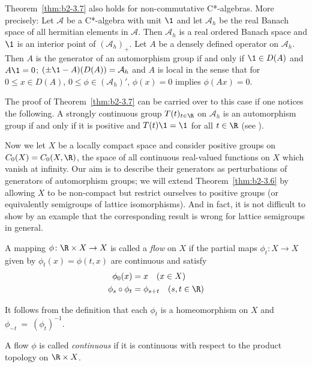 \begin{remark*}\label{rem:b2-3.7b}
Theorem~\ref{thm:b2-3.7} also holds for non-com\-mutative C*-algebras.
More precisely: Let $\mathcal{A}$ be a C*-algebra with unit $\1$ and let $\mathcal{A}_{h}$ be the real Banach space of all hermitian elements in $\mathcal{A}$.
Then $\mathcal{A}_{h}$ is a real ordered Banach space and $\1$ is an interior point of\/ $(\mathcal{A}_{h})_{+}$.
Let $A$ be a densely defined operator on $\mathcal{A}_{h}$.
Then $A$ is the generator of an automorphism group if and only if\/ $\1 \in D(A)$ and $A\1 = 0$; $(\pm\1 - A)(D(A)) = \mathcal{A}_{h}$ and $A$ is local in the sense that for $0 \leq x \in D(A)$, $0 \leq \phi \in (\mathcal{A}_{h})'$, $\phi(x) = 0$ implies $\phi(Ax) = 0$.

The proof of Theorem~\ref{thm:b2-3.7} can be carried over to this case if one notices the following.
A strongly continuous group $T(t)_{t \in \R}$ on $\mathcal{A}_{h}$ is an automorphism group if and only if it is positive and $T(t)\1 = \1$ for all $t \in \R$ (see \textcite[Corollary 3.2.21]{brattelirobinson:1979}).
\end{remark*}

Now we let $X$ be a locally compact space and consider positive groups on $C_{0}(X) = C_{0}(X,\R)$, the space of all continuous real-valued functions on $X$ which vanish at infinity.
Our aim is to describe their generators as perturbations of generators of automorphism groups; \ie  we will extend Theorem~\ref{thm:b2-3.6} by allowing $X$ to be non-compact but
restrict ourselves to positive groups (or equivalently semigroups of lattice isomorphisms).
And in fact, it is not difficult to show by an example that the corresponding result is wrong for lattice semigroups in general.

A mapping $\phi \colon \R \times X \to X$ is called a \emph{flow} on $X$ if the partial maps $\phi_{t} \colon X \to X$ given by $\phi_{t}(x) = \phi(t,x)$ are continuous and satisfy
\begin{align}
\phi_{0}(x) &= x \quad (x \in X) \label{eq:b2-3.8} \\
\phi_{s} \circ \phi_{t} &= \phi_{s+t} \quad (s,t \in \R) \label{eq:b2-3.9}
\end{align}

It follows from the definition that each $\phi_{t}$ is a homeomorphism on $X$ and  \\
$\phi_{-t}~=~(\phi_{t})^{-1}$.

A flow $\phi$ is called \emph{continuous} if it is continuous with respect to the product topology on $\R \times X$.

